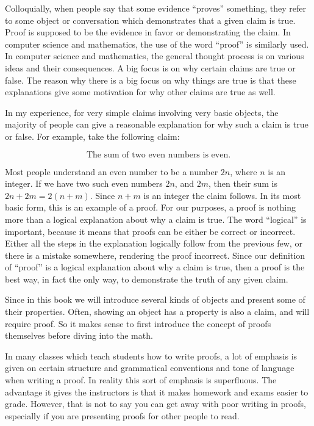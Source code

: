 Colloquially, when people say that some evidence ``proves'' something, they refer to some object or conversation which demonstrates that a given claim is true. Proof is supposed to be the evidence in favor or demonstrating the claim. In computer science and mathematics, the use of the word ``proof'' is similarly used.
In computer science and mathematics, the general thought process is on various ideas and their consequences. A big focus is on why certain claims are true or false. The reason why there is a big focus on why things are true is that these explanations give some motivation for why other claims are true as well.

In my experience, for very simple claims involving very basic objects, the majority of people can give a reasonable explanation for why such a claim is true or false. For example, take the following claim:

\[\text{The sum of two even numbers is even.}\]

Most people understand an even number to be a number $2n$, where $n$ is an integer. If we have two such even numbers $2n$, and $2m$, then their sum is $2n + 2m = 2(n + m)$. Since $n + m$ is an integer the claim follows. In its most basic form, this is an example of a proof. For our purposes, a proof is nothing more than a logical explanation about why a claim is true. The word ``logical'' is important, because it means that proofs can be either be correct or incorrect. Either all the steps in the explanation logically follow from the previous few, or there is a mistake somewhere, rendering the proof incorrect. Since our definition of ``proof'' is a logical explanation about why a claim is true, then a proof is the best way, in fact the only way, to demonstrate the truth of any given claim.

Since in this book we will introduce several kinds of objects and present some of their properties. Often, showing an object has a property is also a claim, and will require proof. So it makes sense to first introduce the concept of proofs themselves before diving into the math.

In many classes which teach students how to write proofs, a lot of emphasis is given on certain structure and grammatical conventions and tone of language when writing a proof. In reality this sort of emphasis is superfluous. The advantage it gives the instructors is that it makes homework and exams easier to grade. However, that is not to say you can get away with poor writing in proofs, especially if you are presenting proofs for other people to read. 

